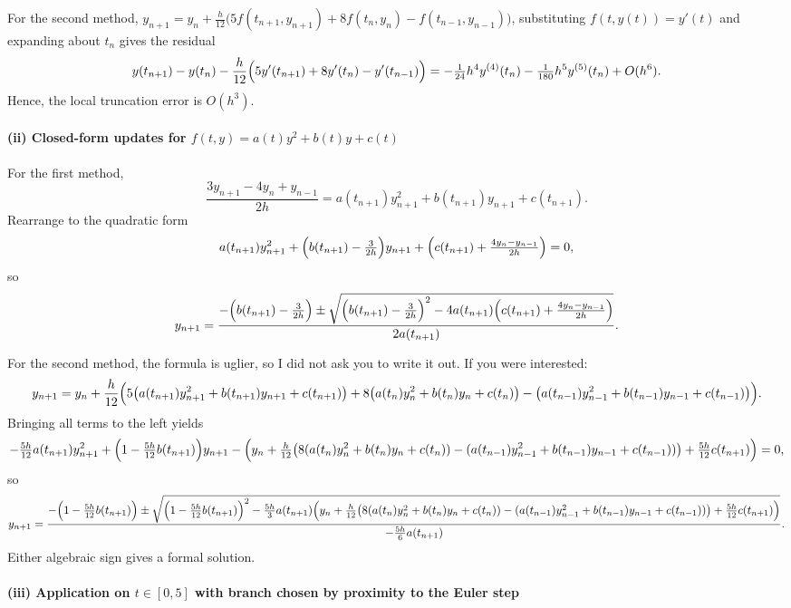 \documentclass[11pt]{article}
\begin{document}
For the second method, \(\displaystyle y_{n+1}=y_{n}+\frac{h}{12}\bigl(5f(t_{n+1},y_{n+1})+8f(t_{n},y_{n})-f(t_{n-1},y_{n-1})\bigr)\),
substituting \(f(t,y(t))=y'(t)\) and expanding about \(t_{n}\) gives the residual
\[
y(t_{n+1})-y(t_{n})-\frac{h}{12}\Bigl(5y'(t_{n+1})+8y'(t_{n})-y'(t_{n-1})\Bigr)
= -\tfrac1{24}h^{4}y^{(4)}(t_{n})-\tfrac1{180}h^{5}y^{(5)}(t_{n})+O(h^{6}).
\]
Hence, the local truncation error is \(O(h^{3})\).

\paragraph{(ii) Closed-form updates for \(f(t,y)=a(t)y^{2}+b(t)y+c(t)\)}

For the first method,
\[
\frac{3y_{n+1}-4y_{n}+y_{n-1}}{2h}=a(t_{n+1})y_{n+1}^{2}+b(t_{n+1})y_{n+1}+c(t_{n+1}).
\]
Rearrange to the quadratic form
\[
a(t_{n+1})y_{n+1}^{2}+\Bigl(b(t_{n+1})-\tfrac{3}{2h}\Bigr)y_{n+1}
+\Bigl(c(t_{n+1})+\tfrac{4y_{n}-y_{n-1}}{2h}\Bigr)=0,
\]
so
\[
y_{n+1}=\frac{-\Bigl(b(t_{n+1})-\tfrac{3}{2h}\Bigr)\pm
\sqrt{\Bigl(b(t_{n+1})-\tfrac{3}{2h}\Bigr)^{2}-4a(t_{n+1})\Bigl(c(t_{n+1})+\tfrac{4y_{n}-y_{n-1}}{2h}\Bigr)}}{2a(t_{n+1})}.
\]

For the second method, the formula is uglier, so I did not ask you to write it out. If you were interested:
\[
y_{n+1}=y_{n}+\frac{h}{12}\Bigl(5\bigl(a(t_{n+1})y_{n+1}^{2}+b(t_{n+1})y_{n+1}+c(t_{n+1})\bigr)
+8\bigl(a(t_{n})y_{n}^{2}+b(t_{n})y_{n}+c(t_{n})\bigr)
-\bigl(a(t_{n-1})y_{n-1}^{2}+b(t_{n-1})y_{n-1}+c(t_{n-1})\bigr)\Bigr).
\]
Bringing all terms to the left yields
\[
-\tfrac{5h}{12}a(t_{n+1})y_{n+1}^{2}
+\Bigl(1-\tfrac{5h}{12}b(t_{n+1})\Bigr)y_{n+1}
-\Bigl(y_{n}+\tfrac{h}{12}\bigl(8(a(t_{n})y_{n}^{2}+b(t_{n})y_{n}+c(t_{n}))
-(a(t_{n-1})y_{n-1}^{2}+b(t_{n-1})y_{n-1}+c(t_{n-1}))\bigr)
+\tfrac{5h}{12}c(t_{n+1})\Bigr)=0,
\]
so
\[
y_{n+1}=\frac{-\Bigl(1-\tfrac{5h}{12}b(t_{n+1})\Bigr)\pm
\sqrt{\Bigl(1-\tfrac{5h}{12}b(t_{n+1})\Bigr)^{2}-\tfrac{5h}{3}a(t_{n+1})\Bigl(
y_{n}+\tfrac{h}{12}\bigl(8(a(t_{n})y_{n}^{2}+b(t_{n})y_{n}+c(t_{n}))
-(a(t_{n-1})y_{n-1}^{2}+b(t_{n-1})y_{n-1}+c(t_{n-1}))\bigr)
+\tfrac{5h}{12}c(t_{n+1})\Bigr)}}{-\tfrac{5h}{6}a(t_{n+1})}.
\]
Either algebraic sign gives a formal solution.

\paragraph{(iii) Application on \(t\in[0,5]\) with branch chosen by proximity to the Euler step}
\end{document}

